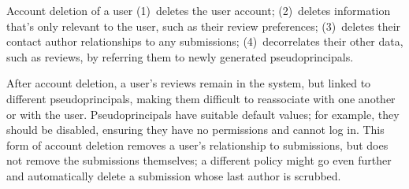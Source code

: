 Account deletion of a user
%
(1)~deletes the user account;
%
(2)~deletes information that's only relevant to the user, such as their review preferences;
%
(3)~deletes their contact author relationships to any submissions;
%
(4)~decorrelates their other data, such as reviews, by referring them to newly generated
pseudoprincipals.

After account deletion, a user's reviews remain in the system, but linked to different
pseudoprincipals, making them difficult to reassociate with one another or with the user.
%
Pseudoprincipals have suitable default values; for example, they should be disabled, ensuring they
have no permissions and cannot log in.
%
This form of account deletion removes a user's relationship to submissions, but does not remove the
submissions themselves; a different policy might go even further and automatically delete a
submission whose last author is scrubbed.

